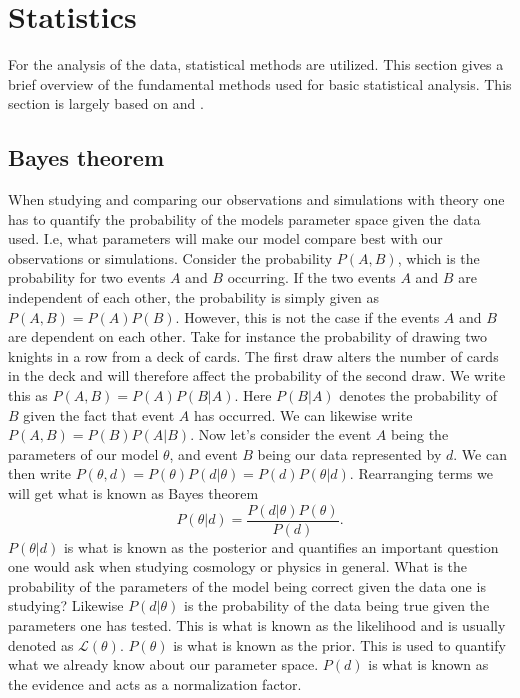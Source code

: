 \section{Statistics}
For the analysis of the data, statistical methods are utilized. This section
gives a brief overview of the fundamental methods used for basic statistical analysis.
This section is largely based on \cite{Probphysics} and \cite{Dataanalysiscosmology}.
\subsection{Bayes theorem}
When studying and comparing our observations and simulations with theory one has
to quantify the probability of the models parameter space given the data used.
I.e, what parameters will make our model compare best with our observations or
simulations. Consider the probability $P(A, B)$, which is the probability for two events $A$ and $B$ occurring.
If the two events $A$ and $B$ are independent of each other, the probability is simply given as $P(A, B) = P(A)P(B)$.
However, this is not the case if the events $A$ and $B$ are dependent on each other. Take for instance the probability
of drawing two knights in a row from a deck of cards. The first draw alters the number of cards in the deck and will therefore affect
the probability of the second draw. We write this as $P(A,B) = P(A)P(B\vert A)$. Here $P(B\vert A)$ denotes the probability of $B$ given the fact that 
event $A$ has occurred. We can likewise write $P(A,B) = P(B)P(A\vert B)$. Now let's consider the event $A$ being the parameters of our model $\theta$, and
event $B$ being our data represented by $d$. We can then write $P(\theta,d) = P(\theta)P(d\vert \theta)=P(d)P(\theta\vert d)$. Rearranging terms we will get
what is known as Bayes theorem\cite{Probphysics}
\begin{equation}\label{eq:bayes}
    P(\theta\vert d) = \frac{P(d\vert \theta)P(\theta)}{P(d)}.
\end{equation}
$P(\theta\vert d)$ is what is known as the posterior and quantifies an
important question one would ask when studying cosmology or physics in general. What is the probability
of the parameters of the model being correct given the data one is studying? Likewise $P(d\vert\theta)$ is the
probability of the data being true given the parameters one has tested. This is what is known as
the likelihood and is usually denoted as $\mathcal{L}(\theta)$. $P(\theta)$ is what is
known as the prior. This is used to quantify what we already know about our
parameter space. $P(d)$ is what is known as the evidence and acts as a
normalization factor. \\

